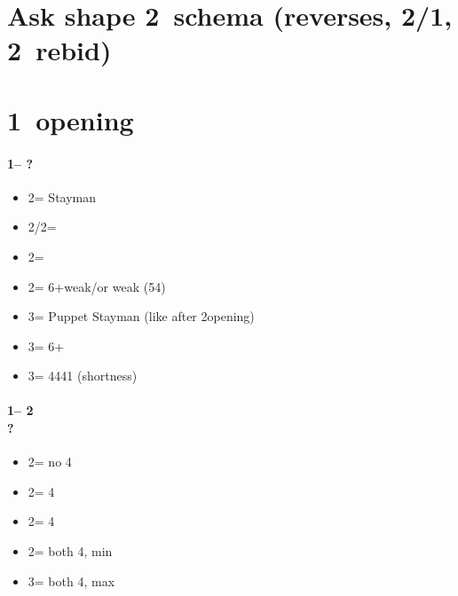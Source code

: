 \documentclass[12pt, a4paper]{report}
\begin{document}
\chapter*{\colorbox{Plum!30}{Ask shape 2\ntch\ schema}
          \colorbox{Plum!30}{(reverses, 2/1, 2\ntch\ rebid)}}

\chapter*{\colorbox{Plum!30}{1\ntch\ opening}}
 {
    \subsubsection*{1\nt -- ?}
    \begin{itemize}
        \item 2\clubs = Stayman
        \item 2\diams/2\hearts = \then \major
        \item 2\spades = \then \clubs
        \item 2\nt = 6+\diams weak/\gf or \minor weak (54)
        \item 3\clubs = Puppet Stayman (like after 2\nt opening) \imp
        \item 3\diams = 6+\diams\ \inv
        \item 3\major = 4441 (\major shortness) \gf \qq
    \end{itemize}

    \subsubsection*{1\nt -- 2\clubs\\
                    ?}
    \begin{itemize}
        \item 2\diams = no 4\major
        \item 2\hearts = 4\hearts
        \item 2\spades = 4\spades
        \item 2\nt = both 4\major, min
        \item 3\clubs = both 4\major, max
    \end{itemize}

}
\end{document}

